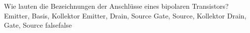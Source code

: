     {Wie lauten die Bezeichnungen der Anschlüsse eines bipolaren Transistors?}
    {Emitter, Basis, Kollektor}
    {Emitter, Drain, Source}
    {Gate, Source, Kollektor}
    {Drain, Gate, Source}
    {false}{false}